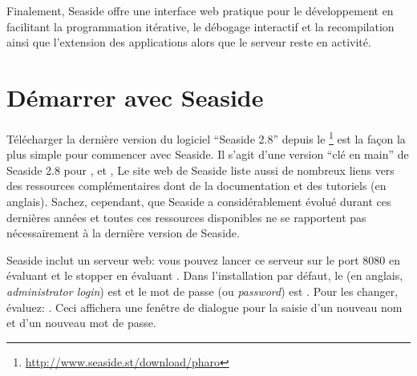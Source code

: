\documentclass[a4paper,10pt,twoside]{book}
\begin{document}
Finalement, Seaside offre une interface web pratique pour le
développement en facilitant la programmation itérative, le débogage
interactif et la recompilation ainsi que l'extension des applications alors
que le serveur reste en activité.

\section{Démarrer avec Seaside}

Télécharger la dernière version du logiciel ``Seaside  2.8'' depuis le \footnote{\url{http://www.seaside.st/download/pharo}} est la façon la plus simple
pour commencer avec Seaside.
Il s'agit d'une version ``clé en main''
de Seaside 2.8 pour ,  et ,
Le site web de Seaside liste aussi de nombreux liens vers des
ressources complémentaires dont de la documentation et des
tutoriels (en anglais).
Sachez, cependant, que Seaside a considérablement évolué durant ces
dernières années et toutes ces ressources disponibles ne se rapportent
pas nécessairement à la dernière version de Seaside.


Seaside inclut un serveur web: vous pouvez lancer ce serveur sur le
port 8080 en évaluant   et le stopper
en évaluant .
Dans l'installation par défaut, le  (en anglais, \emph{administrator login}) est
 et le mot de passe (ou \emph{password}) est .
Pour les changer, évaluez: 
  .
Ceci affichera une fenêtre de dialogue pour la saisie d'un nouveau nom
et d'un nouveau mot de passe. 
\end{document}

